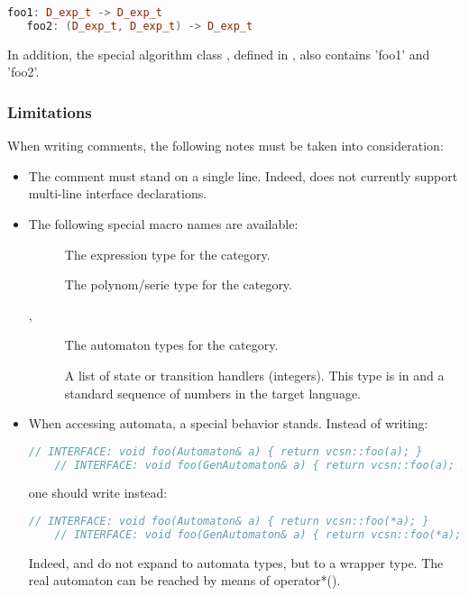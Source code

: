 \begin{lstlisting}[language=C++]
   foo1: D_exp_t -> D_exp_t
   foo2: (D_exp_t, D_exp_t) -> D_exp_t
\end{lstlisting}
 
In   addition,  the   special  algorithm   class  ,   defined  in
, also contains 'foo1' and 'foo2'.
  
\subsubsection{Limitations}

When writing   comments, the following  notes must be
taken into consideration:

\begin{itemize}
\item The comment must stand on a single line.  Indeed,
   does not currently support multi-line interface
  declarations.

\item The following special macro names are available:

  \begin{description}
  \item[] The expression type for the category.
  \item[] The polynom/serie type for the category.
  \item[, ] The automaton types for
    the category.
  \item[] A list of state or transition handlers
    (integers). This type is  in \Cxx and a
    standard sequence of numbers in the target language.
  \end{description}

\item When accessing automata, a special behavior stands. Instead of
  writing:
 
  \begin{lstlisting}[language=C++]
    // INTERFACE: void foo(Automaton& a) { return vcsn::foo(a); }
    // INTERFACE: void foo(GenAutomaton& a) { return vcsn::foo(a); }
  \end{lstlisting}

  one should write instead:

  \begin{lstlisting}[language=C++]
    // INTERFACE: void foo(Automaton& a) { return vcsn::foo(*a); }
    // INTERFACE: void foo(GenAutomaton& a) { return vcsn::foo(*a); }    
  \end{lstlisting}
    
  Indeed,     and    do   not  expand  to
  \Vauc automata types, but to  a wrapper type. The real automaton
  can be reached by means of operator*().

\end{itemize}

